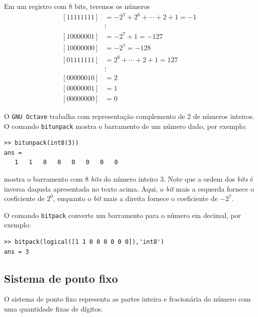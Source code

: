 \begin{ex}
Em um registro com $8$ bits, teremos os números
\begin{equation*}
  \begin{split}
    [11111111] &= -2^7+2^{6}+\cdots+2+1=-1\\
    &\vdots   \\
    [10000001] &= -2^7+1 = -127 \\
    [10000000] &= -2^7   = -128 \\
    [01111111] &= 2^6+\cdots+2+1=127 \\
    &\vdots   \\
    [00000010] &= 2 \\
    [00000001] &= 1 \\
    [00000000] &= 0
  \end{split}
\end{equation*}

\ifisoctave
O \verb+GNU Octave+ trabalha com representação complemento de 2 de números inteiros. O comando \verb+bitunpack+ mostra o barramento de um número dado, por exemplo:
\begin{verbatim}
>> bitunpack(int8(3))
ans =
   1   1   0   0   0   0   0   0
\end{verbatim}
mostra o barramento com $8$ \emph{bits} do número inteiro $3$. Note que a ordem dos \emph{bits} é inversa daquela apresentada no texto acima. Aqui, o \emph{bit} mais a esquerda fornece o coeficiente de $2^0$, enquanto o \emph{bit} mais a direita fornece o coeficiente de $-2^7$.

O comando \verb+bitpack+ converte um barramento para o número em decimal, por exemplo:
\begin{verbatim}
>> bitpack(logical([1 1 0 0 0 0 0 0]),'int8')
ans = 3
\end{verbatim}
\fi
\end{ex}

\subsection{Sistema de ponto fixo}

O sistema de ponto fixo representa as partes inteira e fracionária do número com uma quantidade fixas de dígitos.

